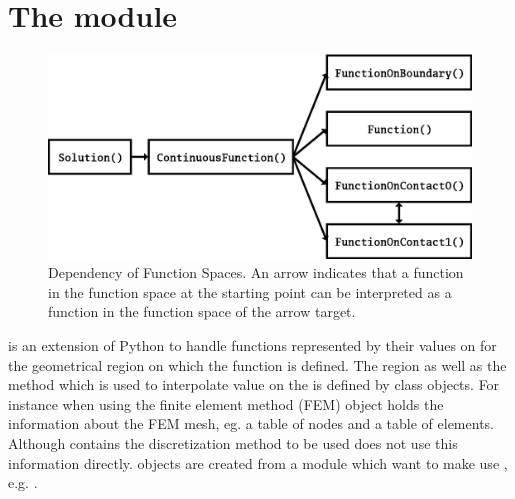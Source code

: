 

\chapter{The module \escript}


\begin{figure}
\includegraphics[width=\textwidth]{EscriptDiagram1.eps}
\caption{\label{ESCRIPT DEP}Dependency of Function Spaces. An arrow indicates that a function in the 
function space at the starting point can be interpreted as a function in the function space of the arrow target.}
\end{figure}

\escript is an extension of Python to handle functions represented by their values on
\DataSamplePoints for the geometrical region on which
the function is defined. The region as well as the method which is used 
to interpolate value on the \DataSamplePoints is defined by     
\Domain class objects. For instance when using 
the finite element method (FEM)  
\Domain object holds the information about the FEM mesh, eg. 
a table of nodes and a table of elements. Although \Domain contains
the discretization method to be used \escript does not use this information directly.
\Domain objects are created from a module which want to make use 
\escript, e.g. \finley.

